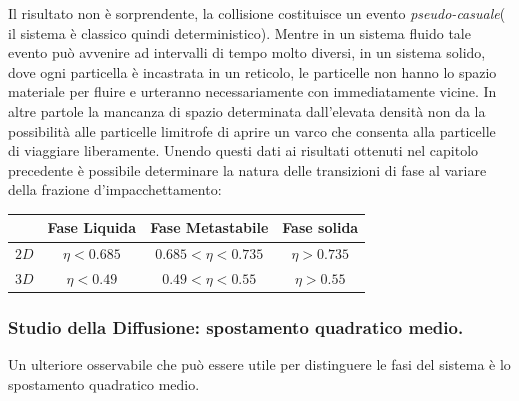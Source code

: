 \documentclass[11pt]{article}
\theoremstyle{plain}
\theoremstyle{remark}
\begin{document}
Il risultato non è sorprendente, la collisione costituisce un evento \emph{pseudo-casuale}( il sistema è classico quindi deterministico).
Mentre in un sistema fluido tale evento può avvenire ad intervalli di tempo molto diversi, in un sistema solido, dove ogni particella è incastrata in un reticolo, le particelle non hanno lo spazio materiale per fluire e urteranno necessariamente con immediatamente vicine. 
In altre partole la mancanza di spazio determinata dall'elevata densità non da la possibilità alle particelle limitrofe di aprire un varco che consenta alla particelle di viaggiare liberamente.
\FloatBarrier 
Unendo questi dati ai risultati ottenuti nel capitolo precedente è possibile determinare la natura delle transizioni di fase al variare della frazione d'impacchettamento:
\begin{center}
\begin{tabular}{|c|c | c | c |}
\hline
		 & Fase Liquida & Fase Metastabile & Fase solida	\\
\hline
	$2D$ & $\eta < 0.685$ & $0.685 <\eta < 0.735$ & $\eta > 0.735$ \\
\hline
	$3D$ & $\eta < 0.49$ & $0.49 <\eta < 0.55$ & $\eta > 0.55$ \\
\hline
\end{tabular}
\end{center}

\FloatBarrier 
\subsubsection{Studio della Diffusione: spostamento quadratico medio.}
Un ulteriore osservabile che può essere utile per distinguere le fasi del sistema è lo spostamento quadratico medio.
\end{document}
